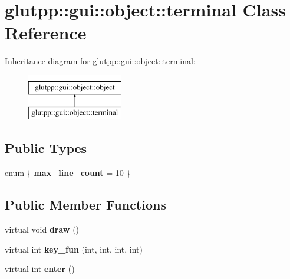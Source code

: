 \hypertarget{classglutpp_1_1gui_1_1object_1_1terminal}{\section{glutpp\-:\-:gui\-:\-:object\-:\-:terminal \-Class \-Reference}
\label{classglutpp_1_1gui_1_1object_1_1terminal}
}
\-Inheritance diagram for glutpp\-:\-:gui\-:\-:object\-:\-:terminal\-:\begin{figure}[H]
\begin{center}
\leavevmode
\includegraphics[height=2.000000cm]{classglutpp_1_1gui_1_1object_1_1terminal}
\end{center}
\end{figure}
\subsection*{\-Public \-Types}
\begin{DoxyCompactItemize}
\item 
enum \{ {\bfseries max\-\_\-line\-\_\-count} =  10
 \}
\end{DoxyCompactItemize}
\subsection*{\-Public \-Member \-Functions}
\begin{DoxyCompactItemize}
\item 
\hypertarget{classglutpp_1_1gui_1_1object_1_1terminal_aa6568349b7e7409360cded62433f6f58}{virtual void {\bfseries draw} ()}\label{classglutpp_1_1gui_1_1object_1_1terminal_aa6568349b7e7409360cded62433f6f58}

\item 
\hypertarget{classglutpp_1_1gui_1_1object_1_1terminal_a3d6f50eaddf7fda7ed5fb4027d1a9a5c}{virtual int {\bfseries key\-\_\-fun} (int, int, int, int)}\label{classglutpp_1_1gui_1_1object_1_1terminal_a3d6f50eaddf7fda7ed5fb4027d1a9a5c}

\item 
\hypertarget{classglutpp_1_1gui_1_1object_1_1terminal_a419430113f8d9a74d1300dc290a6d709}{virtual int {\bfseries enter} ()}\label{classglutpp_1_1gui_1_1object_1_1terminal_a419430113f8d9a74d1300dc290a6d709}

\end{DoxyCompactItemize}
